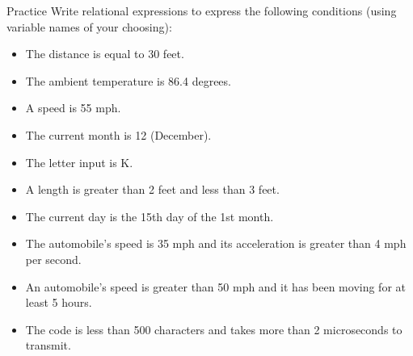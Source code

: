 \documentclass[xcolor={dvipsnames}]{beamer}
\begin{document}
\begin{frame}{Practice}
Write relational expressions to express the following conditions (using variable names of your choosing):
	\begin{itemize}
		\item The distance is equal to 30 feet.	
		\item The ambient temperature is 86.4 degrees.
		\item A speed is 55 mph.
		\item The current month is 12 (December).
		\item The letter input is K.
		\item A length is greater than 2 feet and less than 3 feet.
		\item The current day is the 15th day of the 1st month.
		\item The automobile’s speed is 35 mph and its acceleration is greater than 4 mph per second.
		\item An automobile’s speed is greater than 50 mph and it has been moving for at least 5 hours.
		\item The code is less than 500 characters and takes more than 2 microseconds to transmit.
	\end{itemize}
\end{frame}
\end{document}
